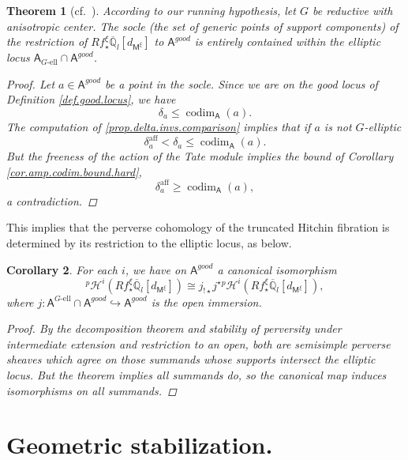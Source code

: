 \documentclass[openany]{amsbook}
\newtheorem{theorem}{Theorem}[chapter]
\newtheorem{corollary}[theorem]{Corollary}
\theoremstyle{definition}
\theoremstyle{remark}
\numberwithin{equation}{section}
\newcommand{\Q}{\mathbb{Q}}
\newcommand{\ol}[1]{\overline{#1}}
\renewcommand{\-}{\operatorname{-}}
\newcommand{\on}[1]{\operatorname{#1}}
\newcommand{\pHi}{{}^p \mathcal{H}^i}
\newcommand{\good}{\mathit{good}}
\newcommand{\bM}{\mathsf{M}}
\newcommand{\bA}{\mathsf{A}}
\newcommand{\aff}{\mathrm{aff}}
\newcommand{\Gell}{G\text{-ell}}
\newcommand{\codim}{\on{codim}}
\begin{document}
\begin{theorem}[{{cf.\ \cite[Th\'eor\`eme 10.5.1]{CLII}}}]\label{thm.no.new.supports}
    According to our running hypothesis, let $G$ be reductive with anisotropic center. The socle (the set of generic points of support components) of the restriction of $Rf_\star^\xi \ol{\Q}_{l} [d_{\bM^\xi}]$ to $\bA^{\good}$ is entirely contained within the elliptic locus $\bA_{\Gell} \cap \bA^{\good}$.
    \begin{proof}
        Let $a \in \bA^{\good}$ be a point in the socle. Since we are on the good locus of Definition \ref{def.good.locus}, we have 
        $$
            \delta_a \le \codim_{\bA}(a).
        $$
        The computation of \ref{prop.delta.invs.comparison} implies that if $a$ is not $G$-elliptic
        $$
            \delta_a^{\aff} < \delta_a \le \codim_{\bA}(a).
        $$
        But the freeness of the action of the Tate module implies the bound of Corollary \ref{cor.amp.codim.bound.hard},
        $$
            \delta_a^{\aff} \ge \codim_{\bA}(a),
        $$
        a contradiction. 
    \end{proof}
\end{theorem}

This implies that the perverse cohomology of the truncated Hitchin fibration is determined by its restriction to the elliptic locus, as below. 

\begin{corollary}\label{cor.coh.intermed.ext.from.ell.locus}
    For each $i$, we have on $\bA^{\good}$ a canonical isomorphism 
    $$
        \pHi(Rf_\star^\xi \ol{\Q}_l[d_{\bM^\xi}]) \cong j_{!\star} j^\star \pHi(Rf_\star^\xi \ol{\Q}_l[d_{\bM^\xi}]),
    $$
    where $j : \bA^{\Gell} \cap \bA^{\good} \hookrightarrow \bA^{\good}$ is the open immersion.
    \begin{proof}
        By the decomposition theorem and stability of perversity under intermediate extension and restriction to an open, both are semisimple perverse sheaves which agree on those summands whose supports intersect the elliptic locus. But the theorem implies all summands do, so the canonical map induces isomorphisms on all summands.
    \end{proof}
\end{corollary}







\section{Geometric stabilization.}
\end{document}
